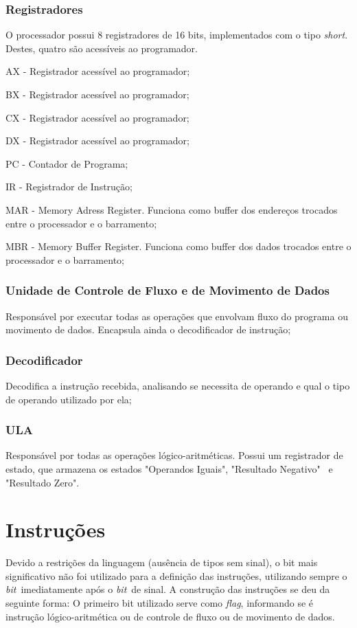 \documentclass[
	12pt,				%
	oneside,			%
	a4paper,			%
	english,			%
	french,				%
	spanish,			%
	brazil,				%
	]{abntex2}
\begin{document}
{		\subsubsection{Registradores}
		O processador possui 8 registradores de 16 bits, implementados com o
		tipo \textit{short}. Destes, quatro são acessíveis ao programador.
		\begin{alineas}
			\item
				AX - Registrador acessível ao programador;
			\item
				BX - Registrador acessível ao programador;
			\item
				CX - Registrador acessível ao programador;
			\item
				DX - Registrador acessível ao programador;
			\item
				PC - Contador de Programa;
			\item
				IR - Registrador de Instrução;
			\item
				MAR - Memory Adress Register. Funciona como buffer dos
				endereços trocados entre o processador e o barramento;
			\item
				MBR - Memory Buffer Register. Funciona como buffer dos
				dados trocados entre o processador e o barramento;
		\end{alineas}

		\subsubsection{Unidade de Controle de Fluxo e de Movimento de Dados}
		Responsável por executar todas as operações que envolvam fluxo do
		programa ou movimento de dados. Encapsula ainda o decodificador de
		instrução;
		\subsubsection{Decodificador}
		Decodifica a instrução recebida, analisando se necessita de operando e
		qual o tipo de operando utilizado por ela;
		\subsubsection{ULA}
		Responsável por todas as operações lógico-aritméticas. Possui um
		registrador de estado, que armazena os estados "Operandos Iguais",
		"Resultado Negativo"~ e "Resultado Zero".


\section{Instruções}
Devido a restrições da linguagem (ausência de tipos sem sinal), o bit mais
significativo não foi utilizado para a definição das instruções, utilizando
sempre o \textit{bit}~imediatamente após o \textit{bit}~de sinal. A construção
das instruções se deu da seguinte forma: O primeiro bit utilizado serve como
\textit{flag}, informando se é instrução lógico-aritmética ou de controle de
fluxo ou de movimento de dados.

}
\end{document}
